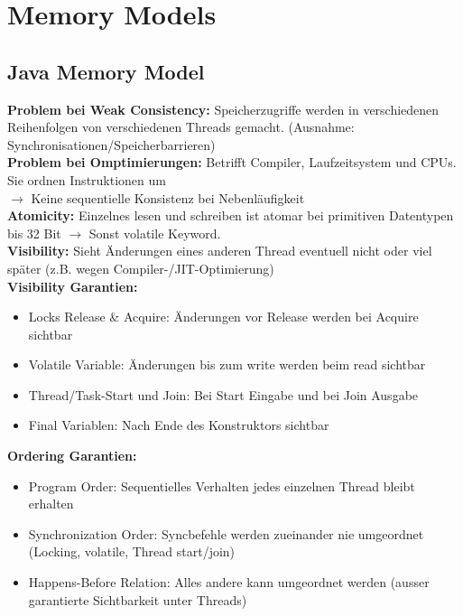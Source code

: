 
\section{Memory Models}
\subsection{Java Memory Model}
\textcolor{b}{\textbf{Problem bei Weak Consistency:}} Speicherzugriffe werden in verschiedenen Reihenfolgen von verschiedenen Threads gemacht. (Ausnahme: Synchronisationen/Speicherbarrieren)\\
\textcolor{b}{\textbf{Problem bei Omptimierungen:}} Betrifft Compiler, Laufzeitsystem und CPUs. Sie ordnen Instruktionen um\\
$\rightarrow$ Keine sequentielle Konsistenz bei Nebenläufigkeit\\
\textcolor{b}{\textbf{Atomicity:}} Einzelnes lesen und schreiben ist atomar bei primitiven Datentypen bis 32 Bit $\rightarrow$ Sonst \textcolor{b}{volatile} Keyword.\\
\textcolor{b}{\textbf{Visibility:}} Sieht Änderungen eines anderen Thread eventuell nicht oder viel später (z.B. wegen Compiler-/JIT-Optimierung)\\
\textbf{Visibility Garantien:}
\begin{itemize}[topsep=0pt, leftmargin=3mm]
    \setlength\itemsep{-0.3em}
    \item Locks Release \& Acquire: Änderungen vor Release werden bei Acquire sichtbar
    \item Volatile Variable: Änderungen bis zum write werden beim read sichtbar
    \item Thread/Task-Start und Join: Bei Start Eingabe und bei Join Ausgabe
    \item Final Variablen: Nach Ende des Konstruktors sichtbar
\end{itemize}
\textcolor{b}{\textbf{Ordering Garantien:}}
\begin{itemize}[topsep=0pt, leftmargin=3mm]
    \setlength\itemsep{-0.3em}
    \item Program Order: Sequentielles Verhalten jedes einzelnen Thread bleibt erhalten
    \item Synchronization Order: Syncbefehle werden zueinander nie umgeordnet (Locking, volatile, Thread start/join)
    \item Happens-Before Relation: Alles andere kann umgeordnet werden (ausser garantierte Sichtbarkeit unter Threads)
\end{itemize}
